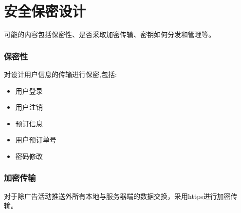 \chapter{安全保密设计}
可能的内容包括保密性、是否采取加密传输、密钥如何分发和管理等。

\subsection{保密性}

对设计用户信息的传输进行保密,包括:
\begin{itemize}
	\item 用户登录
	\item 用户注销
	\item 预订信息
	\item 用户预订单号
	\item 密码修改
\end{itemize}

\subsection{加密传输}

对于除广告活动推送外所有本地与服务器端的数据交换，采用https进行加密传输。